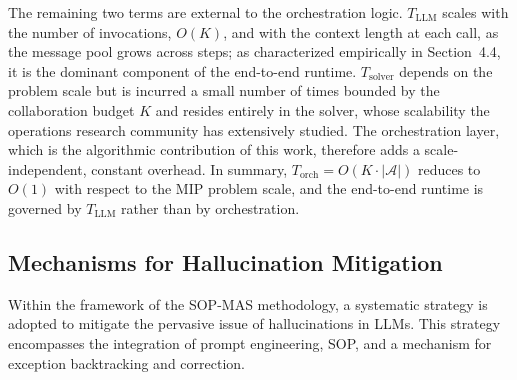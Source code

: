 \documentclass[preprint,12pt]{elsarticle}
\begin{document}
The remaining two terms are external to the orchestration logic. $T_{\text{LLM}}$ scales with the number of invocations, $O(K)$, and with the context length at each call, as the message pool grows across steps; as characterized empirically in Section~4.4, it is the dominant component of the end-to-end runtime. $T_{\text{solver}}$ depends on the problem scale but is incurred a small number of times bounded by the collaboration budget $K$ and resides entirely in the solver, whose scalability the operations research community has extensively studied. The orchestration layer, which is the algorithmic contribution of this work, therefore adds a scale-independent, constant overhead. In summary, $T_{\text{orch}}=O(K\cdot|\mathcal{A}|)$ reduces to $O(1)$ with respect to the MIP problem scale, and the end-to-end runtime is governed by $T_{\text{LLM}}$ rather than by orchestration.

\subsection{Mechanisms for Hallucination Mitigation}

Within the framework of the SOP-MAS methodology, a systematic strategy is adopted to mitigate the pervasive issue of hallucinations in LLMs. This strategy encompasses the integration of prompt engineering, SOP, and a mechanism for exception backtracking and correction.
\end{document}
